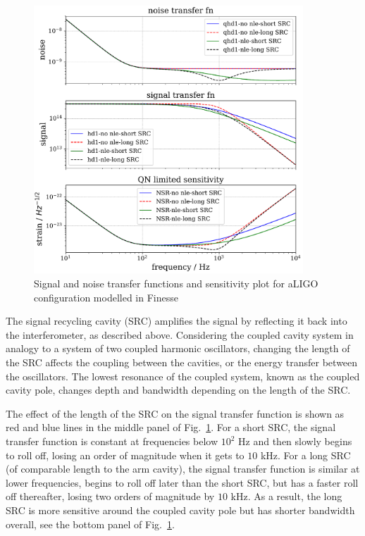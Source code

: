 \documentclass[aps,pra,superscriptaddress,reprint,nofootinbib]{revtex4-1}
\begin{document}
\begin{figure}
	\begin{center}
	\includegraphics[width=0.9\textwidth]{figures/aLIGO_transfer_fns_and_sensitivity_comparison.pdf}
	\end{center}
	\caption{Signal and noise transfer functions and sensitivity plot for aLIGO configuration modelled in Finesse}
	\label{fig:src_transfer_functions}
\end{figure}

The signal recycling cavity (SRC) amplifies the signal by reflecting it back into the interferometer, as described above.
Considering the coupled cavity system in analogy to a system of two coupled harmonic oscillators, changing the length of the SRC affects the coupling between the cavities, or the energy transfer between the oscillators. The lowest resonance of the coupled system, known as the coupled cavity pole, changes depth and bandwidth depending on the length of the SRC.


The effect of the length of the SRC on the signal transfer function is shown as red and blue lines in the middle panel of Fig.~\ref{fig:src_transfer_functions}.
For a short SRC, the signal transfer function is constant at frequencies below $10^2$ Hz and then slowly begins to roll off, losing an order of magnitude when it gets to $10$ kHz. For a long SRC (of comparable length to the arm cavity), the signal transfer function is similar at lower frequencies, begins to roll off later than the short SRC, but has a faster roll off thereafter, losing two orders of magnitude by $10$ kHz. As a result, the long SRC is more sensitive around the coupled cavity pole but has shorter bandwidth overall, see the bottom panel of Fig.~\ref{fig:src_transfer_functions}.
\end{document}
